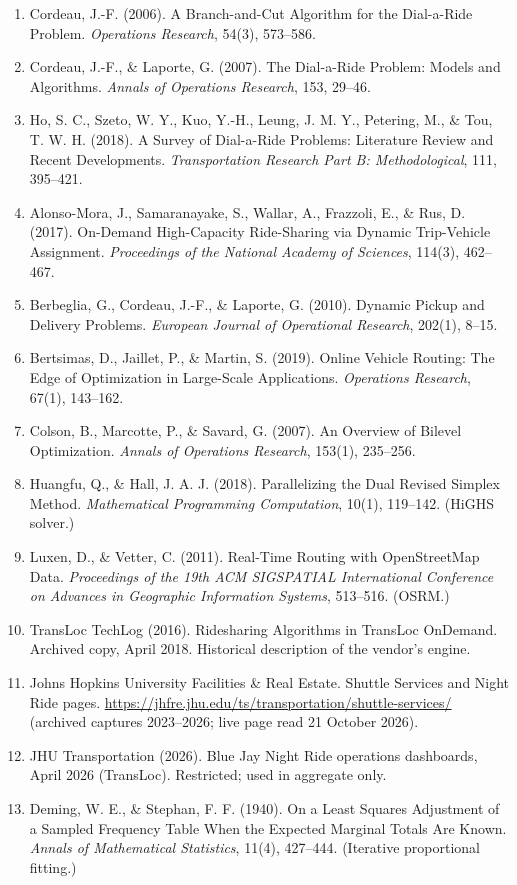 \documentclass{article}
\begin{document}
{\small
\begin{enumerate}\itemsep 2pt \parskip 0pt
\item Cordeau, J.-F. (2006). A Branch-and-Cut Algorithm for the Dial-a-Ride Problem. \emph{Operations Research}, 54(3), 573--586.
\item Cordeau, J.-F., \& Laporte, G. (2007). The Dial-a-Ride Problem: Models and Algorithms. \emph{Annals of Operations Research}, 153, 29--46.
\item Ho, S. C., Szeto, W. Y., Kuo, Y.-H., Leung, J. M. Y., Petering, M., \& Tou, T. W. H. (2018). A Survey of Dial-a-Ride Problems: Literature Review and Recent Developments. \emph{Transportation Research Part B: Methodological}, 111, 395--421.
\item Alonso-Mora, J., Samaranayake, S., Wallar, A., Frazzoli, E., \& Rus, D. (2017). On-Demand High-Capacity Ride-Sharing via Dynamic Trip-Vehicle Assignment. \emph{Proceedings of the National Academy of Sciences}, 114(3), 462--467.
\item Berbeglia, G., Cordeau, J.-F., \& Laporte, G. (2010). Dynamic Pickup and Delivery Problems. \emph{European Journal of Operational Research}, 202(1), 8--15.
\item Bertsimas, D., Jaillet, P., \& Martin, S. (2019). Online Vehicle Routing: The Edge of Optimization in Large-Scale Applications. \emph{Operations Research}, 67(1), 143--162.
\item Colson, B., Marcotte, P., \& Savard, G. (2007). An Overview of Bilevel Optimization. \emph{Annals of Operations Research}, 153(1), 235--256.
\item Huangfu, Q., \& Hall, J. A. J. (2018). Parallelizing the Dual Revised Simplex Method. \emph{Mathematical Programming Computation}, 10(1), 119--142. (HiGHS solver.)
\item Luxen, D., \& Vetter, C. (2011). Real-Time Routing with OpenStreetMap Data. \emph{Proceedings of the 19th ACM SIGSPATIAL International Conference on Advances in Geographic Information Systems}, 513--516. (OSRM.)
\item TransLoc TechLog (2016). Ridesharing Algorithms in TransLoc OnDemand. Archived copy, April 2018. Historical description of the vendor's engine.
\item Johns Hopkins University Facilities \& Real Estate. Shuttle Services and Night Ride pages. \url{https://jhfre.jhu.edu/ts/transportation/}\linebreak[0]\url{shuttle-services/} (archived captures 2023--2026; live page read 21 October 2026).
\item JHU Transportation (2026). Blue Jay Night Ride operations dashboards, April 2026 (TransLoc). Restricted; used in aggregate only.
\item Deming, W. E., \& Stephan, F. F. (1940). On a Least Squares Adjustment of a Sampled Frequency Table When the Expected Marginal Totals Are Known. \emph{Annals of Mathematical Statistics}, 11(4), 427--444. (Iterative proportional fitting.)
\end{enumerate}
}
\end{document}

